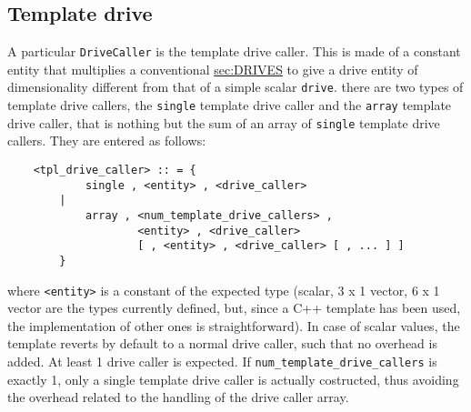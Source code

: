 \subsection{Template drive}\label{sec:TPL-DRIVES}
A particular \texttt{DriveCaller} is the template drive caller. This is made
of a constant entity that multiplies a conventional 
\hyperref{\texttt{drive}}{\texttt{drive} (see Section~}{)}{sec:DRIVES} to give a drive
entity of dimensionality different from that of a simple scalar \texttt{drive}.
there are two types of template drive callers, the \texttt{single} template 
drive caller and the \texttt{array} template drive caller, 
that is nothing but the sum of an array of \texttt{single}
template drive callers. 
They are entered as follows:
\begin{verbatim}
    <tpl_drive_caller> :: = {
            single , <entity> , <drive_caller> 
        |
            array , <num_template_drive_callers> ,
                    <entity> , <drive_caller>
                    [ , <entity> , <drive_caller> [ , ... ] ]
        }
\end{verbatim}
where \texttt{<entity>} is a constant of the expected type (scalar, 3 x 1 vector,
6 x 1 vector are the types currently defined, but, since a C++ template has
been used, the implementation of other ones is straightforward). In case of
scalar values, the template reverts by default to a normal drive caller,
such that no overhead is added.
At least 1 drive caller is expected. 
If \texttt{num\_template\_drive\_callers} is exactly 1, only a single
template drive caller is actually costructed, thus avoiding the overhead 
related to the handling of the drive caller array.    



